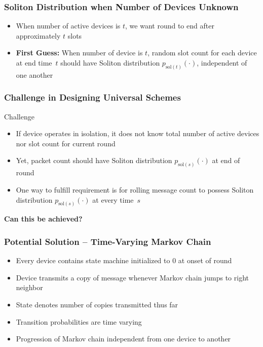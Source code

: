 \documentclass[10pt]{beamer}
\begin{document}
\begin{frame}
\frametitle{Soliton Distribution when Number of Devices Unknown}
  \begin{center}
  
  \end{center}
  \begin{itemize}
  \item When number of active devices is $t$, we want round to end after approximately $t$ slots
  \item \textbf{First Guess:} When number of device is $t$, random slot count for each device at end time~$t$ should have Soliton distribution $p_{\mathrm{sol}(t)}(\cdot)$, independent of one another
  \end{itemize}
\end{frame}


\begin{frame}
\frametitle{Challenge in Designing Universal Schemes}
\begin{block}{Challenge}
\begin{itemize}
\item If device operates in isolation, it does not know total number of active devices nor slot count for current round
\item Yet, packet count should have Soliton distribution $p_{\mathrm{sol}(s)}(\cdot)$ at end of round
\item  One way to fulfill requirement is for rolling message count to possess Soliton distribution $p_{\mathrm{sol}(s)}(\cdot)$ at every time~$s$
\end{itemize}
\end{block}
\begin{center}
\textbf{Can this be achieved?}
\end{center}
\end{frame}


\begin{frame}
\frametitle{Potential Solution -- Time-Varying Markov Chain}
\begin{center}

\end{center}
\begin{itemize}
\item Every device contains state machine initialized to 0 at onset of round
\item Device transmits a copy of message whenever Markov chain jumps to right neighbor
\item State denotes number of copies transmitted thus far
\item Transition probabilities are time varying
\item Progression of Markov chain independent from one device to another
\end{itemize}
\end{frame}
\end{document}
